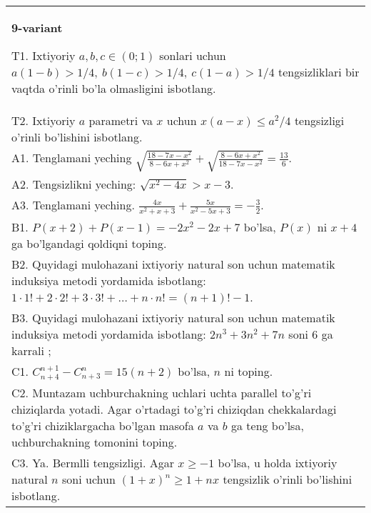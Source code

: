 \documentclass{article}
\begin{document}
\begin{tabular}{m{17cm}}
\textbf{9-variant}
\newline

T1. Ixtiyoriy \(a,b,c \in (0;1)\) sonlari uchun \(a(1 - b) > 1/4,\ b(1 - c) > 1/4,\ c(1 - a) > 1/4\) tengsizliklari bir vaqtda o'rinli bo'la olmasligini isbotlang. \\
T2. Ixtiyoriy \(a\) parametri va \(x\) uchun \(x(a - x) \leq a^{2}/4\) tengsizligi o'rinli bo'lishini isbotlang. \\
A1. Tenglamani yeching \(\sqrt{\frac{18 - 7x - x^{2}}{8 - 6x + x^{2}}} + \sqrt{\frac{8 - 6x + x^{2}}{18 - 7x - x^{2}}} = \frac{13}{6}\). \\
A2. Tengsizlikni yeching: \(\sqrt{x^{2} - 4x} > x - 3\). \\
A3. Tenglamani yeching. \(\frac{4x}{x^{2} + x + 3} + \frac{5x}{x^{2} - 5x + 3} = - \frac{3}{2}\). \\
B1. \(P(x + 2) + P(x - 1) = - 2x^{2} - 2x + 7\) bo'lsa, \(P(x)\) ni \(x + 4\) ga bo'lgandagi qoldiqni toping. \\
B2. Quyidagi mulohazani ixtiyoriy natural son uchun matematik induksiya metodi yordamida isbotlang: \(1 \cdot 1! + 2 \cdot 2! + 3 \cdot 3! + \ldots + n \cdot n! = (n + 1)! - 1\). \\
B3. Quyidagi mulohazani ixtiyoriy natural son uchun matematik induksiya metodi yordamida isbotlang: \(2n^{3} + 3n^{2} + 7n\) soni 6 ga karrali ; \\
C1. \(C_{n + 4}^{n + 1} - C_{n + 3}^{n} = 15(n + 2)\) bo'lsa, \(n\) ni toping. \\
C2. Muntazam uchburchakning uchlari uchta parallel to'g'ri chiziqlarda yotadi. Agar o'rtadagi to'g'ri chiziqdan chekkalardagi to'g'ri chiziklargacha bo'lgan masofa \(a\) va \(b\) ga teng bo'lsa, uchburchakning tomonini toping. \\
C3. Ya. Bermlli tengsizligi. Agar \(x \geq - 1\) bo'lsa, u holda ixtiyoriy natural \(n\) soni uchun \((1 + x)^{n} \geq 1 + nx\) tengsizlik o'rinli bo'lishini isbotlang. \\

\end{tabular}
\vspace{1cm}
\end{document}

